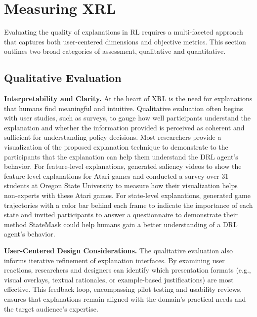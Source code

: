 \section{Measuring XRL}
Evaluating the quality of explanations in RL requires a multi-faceted approach that captures both user-centered dimensions and objective metrics. This section outlines two broad categories of assessment, \ie qualitative and quantitative.

\subsection{Qualitative Evaluation}
\textbf{Interpretability and Clarity.}
At the heart of XRL is the need for explanations that humans find meaningful and intuitive. Qualitative evaluation often begins with user studies, such as surveys, to gauge how well participants understand the explanation and whether the information provided is perceived as coherent and sufficient for understanding policy decisions. Most researchers provide a visualization of the proposed explanation technique to demonstrate to the participants that the explanation can help them understand the DRL agent's behavior. For feature-level explanations, \citet{greydanus2018visualizing} generated saliency videos to show the feature-level explanations for Atari games and conducted a survey over 31 students at Oregon State University to measure how their visualization helps non-experts with these Atari games. For state-level explanations, \citet{cheng2023statemask} generated game trajectories with a color bar behind each frame to indicate the importance of each state and invited participants to answer a questionnaire to demonstrate their method StateMask could help humans gain a better understanding
of a DRL agent’s behavior.


\noindent\textbf{User-Centered Design Considerations.}
The qualitative evaluation also informs iterative refinement of explanation interfaces. By examining user reactions, researchers and designers can identify which presentation formats (e.g., visual overlays, textual rationales, or example-based justifications) are most effective. This feedback loop, encompassing pilot testing and usability reviews, ensures that explanations remain aligned with the domain’s practical needs and the target audience’s expertise.


